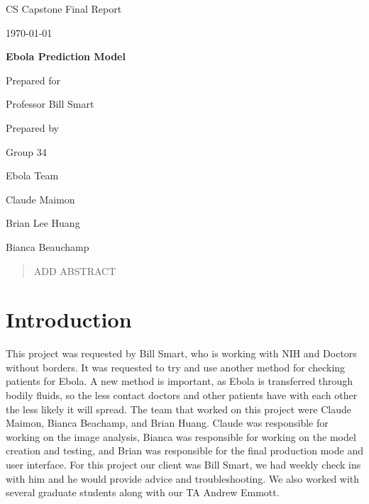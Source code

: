 \documentclass[onecolumn, draftclsnofoot,10pt, compsoc]{IEEEtran}
\def \CapstoneTeamName{		Ebola Team}
\def \CapstoneTeamNumber{		34}
\def \GroupMemberOne{			Claude Maimon}
\def \GroupMemberTwo{			Brian Lee Huang}
\def \GroupMemberThree{			Bianca Beauchamp}
\def \CapstoneProjectName{		Ebola Prediction Model}
\def \CapstoneSponsorCompany{	Professor Bill Smart}
\def \DocType{		Final Report
}
\newcommand{\NameSigPair}[1]{\par
	\makebox[2.75in][r]{#1} \hfil 	\makebox[3.25in]{\makebox[2.25in]{\hrulefill} \hfill		\makebox[.75in]{\hrulefill}}
	\par\vspace{-12pt} \textit{\tiny\noindent
		\makebox[2.75in]{} \hfil		\makebox[3.25in]{\makebox[2.25in][r]{Signature} \hfill	\makebox[.75in][r]{Date}}}}
\renewcommand{\NameSigPair}[1]{#1}
\begin{document}
	\begin{titlepage}
		\begin{singlespace}
			\hfill 
			\par\vspace{.2in}
			\centering
			\scshape{
				\huge CS Capstone \DocType \par
				{\large\today}\par
				\vspace{.5in}
				\textbf{\Huge\CapstoneProjectName}\par
				\vfill
				{\large Prepared for}\par
				\Huge \CapstoneSponsorCompany\par
				\vspace{5pt}
				{\large Prepared by }\par
				Group\CapstoneTeamNumber\par
				\CapstoneTeamName\par 
				\vspace{5pt}
				{\Large
					\NameSigPair{\GroupMemberOne}\par
					\NameSigPair{\GroupMemberTwo}\par
					\NameSigPair{\GroupMemberThree}\par
				}
				\vspace{20pt}
			}
			\begin{abstract}
				ADD ABSTRACT	
			\end{abstract}  
		   
		\end{singlespace}
	\end{titlepage}

	\newpage
	\tableofcontents
	\clearpage
	
	\section{Introduction}
	
	This project was requested by Bill Smart, who is working with NIH and Doctors without borders. It was requested to try and use another method for checking patients for Ebola. A new method is important, as Ebola is transferred through bodily fluids, so the less contact doctors and other patients have with each other the less likely it will spread. The team that worked on this project were Claude Maimon, Bianca Beachamp, and Brian Huang. Claude was responsible for working on the image analysis, Bianca was responsible for working on the model creation and testing, and Brian was responsible for the final production mode and user interface. For this project our client was Bill Smart, we had weekly check ins with him and he would provide advice and troubleshooting. We also worked with several graduate students along with our TA Andrew Emmott.
		
\end{document}
